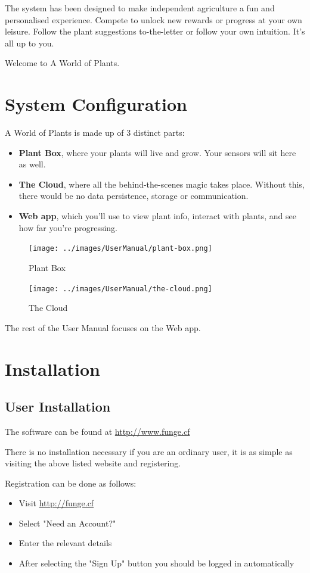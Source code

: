 \documentclass{article}
\begin{document}
	The system has been designed to make independent agriculture a fun and personalised experience. Compete to unlock new rewards or progress at your own leisure. Follow the plant suggestions to-the-letter or follow your own intuition. It's all up to you.
	
	Welcome to A World of Plants.

\section{System Configuration}
	A World of Plants is made up of 3 distinct parts:
	\begin{itemize}
		\item \textbf{Plant Box}, where your plants will live and grow. Your sensors will sit here as well.
		\item \textbf{The Cloud}, where all the behind-the-scenes magic takes place. Without this, there would be no data persistence, storage or communication.
		\item \textbf{Web app}, which you'll use to view plant info, interact with plants, and see how far you're progressing.
	\end{itemize}
	
	\begin{figure}[H]
		\texttt{[image: ../images/UserManual/plant-box.png]}
		\caption{Plant Box}
	\end{figure}
	
	\begin{figure}[H]
		\texttt{[image: ../images/UserManual/the-cloud.png]}
		\caption{The Cloud}
	\end{figure}
	
	The rest of the User Manual focuses on the Web app.
\section{Installation}
	\subsection{User Installation}
		The software can be found at \url{http://www.funge.cf}
		
		There is no installation necessary if you are an ordinary user, it is as simple as visiting the above listed website and registering.
		
		Registration can be done as follows:
		\begin{itemize}
			\item Visit \url{http://funge.cf}
			\item Select "Need an Account?"
			\item Enter the relevant details
			\item After selecting the "Sign Up" button you should be logged in automatically
		\end{itemize}
	
\end{document}
